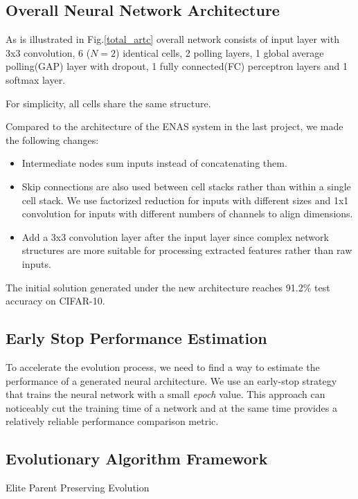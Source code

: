 \documentclass{article}
\begin{document}
\begin{normalsize}
   \subsection{Overall Neural Network Architecture}
   As is illustrated in Fig.\ref{total_artc} overall network consists of input layer with 3x3 convolution, 6 ($N = 2$) identical cells, 2 polling layers, 1 global average polling(GAP) layer with dropout, 1 fully connected(FC) perceptron layers and 1 softmax layer. 
 
   For simplicity, all cells share the same structure. 

   Compared to the architecture of the ENAS system in the last project, we made the following changes:
   \begin{itemize}
     \item Intermediate nodes sum inputs instead of concatenating them.
     \item Skip connections are also used between cell stacks rather than within a single cell stack. We use factorized reduction for inputs with different sizes\cite{zoph2018learning} and 1x1 convolution for inputs with different numbers of channels to align dimensions.
     \item Add a 3x3 convolution layer after the input layer since complex network structures are more suitable for processing extracted features rather than raw inputs.
   \end{itemize}
   The initial solution generated under the new architecture reaches 91.2\% test accuracy on CIFAR-10.
   \subsection{Early Stop Performance Estimation}
 
   To accelerate the evolution process, we need to find a way to estimate the performance of a generated neural architecture. We use an early-stop strategy that trains the neural network with a small \emph{epoch} value. This approach can noticeably cut the training time of a network and at the same time provides a relatively reliable performance comparison metric.
 
   \subsection{Evolutionary Algorithm Framework}
   
   \begin{algorithm}[H]  
     \caption{ Elite Parent Preserving Evolution}
     \begin{algorithmic}[1]  
   

\end{algorithmic}
\end{algorithm}
\end{normalsize}
\end{document}
